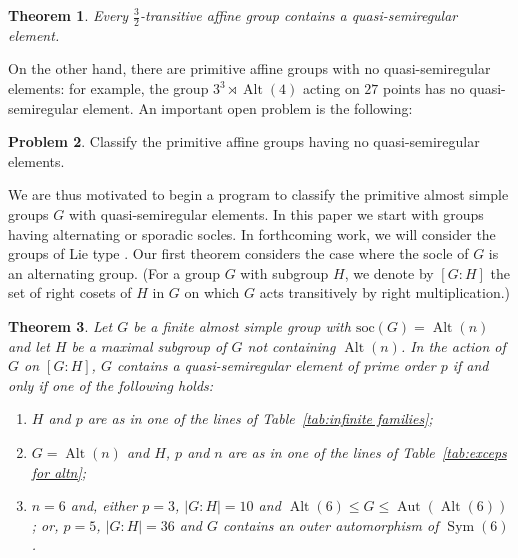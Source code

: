 \documentclass{article}
\newtheorem{thm}{Theorem}[section]
\theoremstyle{remark}
\theoremstyle{definition}
\newtheorem{problem}[thm]{Problem}
\DeclareMathOperator{\Alt}{Alt}
\DeclareMathOperator{\Sym}{Sym}
\DeclareMathOperator{\Aut}{Aut}
\newcommand{\soc}{\mathrm{soc}}
\newcommand{\qsre}{quasi-semiregular element}
\newcommand{\qsres}{quasi-semiregular elements}
\begin{document}
\begin{thm}
\label{intro thm:3/2}
Every $\frac{3}{2}$-transitive  affine group contains a {\qsre}.
\end{thm}

On the other hand, there are primitive affine groups with no {\qsres}: for example, the group $3^3 \rtimes \Alt(4)$ acting on $27$ points has no {\qsre}. An important open problem is the following:

\begin{problem}
    Classify the primitive affine groups having no  {\qsres}. 
\end{problem}

We are thus motivated to 
begin a program to classify the primitive almost simple groups $G$ with {\qsres}. In this paper we start  with groups having alternating or sporadic socles.  In forthcoming work, we will consider the groups of Lie type \cite{GMPlieqsres}.  Our first theorem considers the case where the socle of $G$ is an alternating group. (For a group $G$ with subgroup $H$, we denote by $[G:H]$ the set of right cosets of $H$ in $G$ on which $G$ acts transitively by right multiplication.)

\begin{thm}
\label{intro thm:alt or sym}
Let $G$ be a finite almost simple group with $\soc(G) = \Alt(n)$ and let $H$ be a maximal subgroup of $G$ not containing $\Alt(n)$. In the action of $G$ on $[G:H]$, $G$ contains a {\qsre} of prime order $p$ if and only if one of the following holds:
\begin{enumerate}[(1)]
\item $H$ and $p$ are as in one of the lines of Table~\ref{tab:infinite families};
\item $G=\Alt(n)$ and $H$, $p$ and $n$ are as in  one of the lines of Table~\ref{tab:exceps for altn};
\item $n=6$ and, either $p=3$, $|G:H| =10$ and $\Alt(6) \leqslant G \leqslant \Aut(\Alt(6))$; or, $p=5$, $|G:H|=36$ and $G$ contains an outer automorphism of $\Sym(6)$.
\end{enumerate}
\end{thm}
\end{document}
